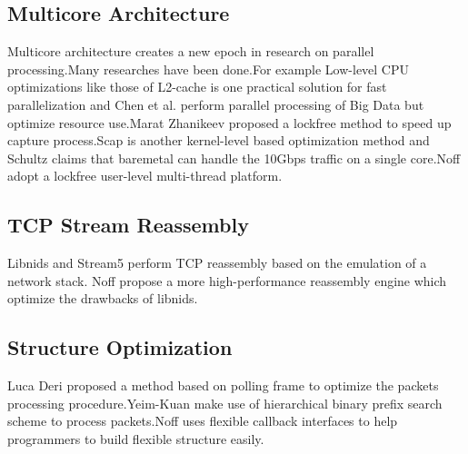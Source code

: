 \documentclass[conference]{IEEEtran}
\begin{document}
\subsection{Multicore Architecture}
Multicore architecture creates a new epoch in research on parallel processing.Many researches have been done.For example Low-level CPU optimizations like those of
L2-cache is one practical solution for fast parallelization\cite{Zhanikeev} and Chen et al. \cite{MapReduce} perform parallel processing of Big Data but optimize resource use.Marat Zhanikeev\cite{Zhanikeev} proposed a lockfree method to speed up capture process.Scap\cite{Papadogiannakis} is another kernel-level based optimization method and Schultz\cite{Schultz} claims that baremetal can handle the 10Gbps traffic on a single core.Noff adopt a lockfree user-level multi-thread platform.
\subsection{TCP Stream Reassembly}
Libnids\cite{Libnids} and Stream5\cite{Sturges} perform TCP reassembly based on the emulation of a network stack. Noff propose a more high-performance reassembly engine which optimize the drawbacks of libnids.


\subsection{Structure Optimization}
Luca Deri\cite{Deri} proposed a method based on polling frame to optimize the packets processing procedure.Yeim-Kuan\cite{Chang} make use of hierarchical binary prefix search scheme to process packets.Noff uses flexible callback interfaces to help programmers to build flexible structure easily.
\end{document}
